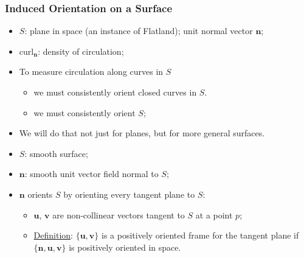 \begin{frame}
  \frametitle{Induced Orientation on a Surface}

  \begin{itemize}
    \item $S$: plane in space (an instance of Flatland); unit normal vector $\textbf{n}$;
    \item $\text{curl}_{\textbf{n}}$: density of circulation;
    \item \pause To measure circulation along curves in $S$
    \begin{itemize}
      \item we must consistently orient closed curves in $S$.
      \item we must consistently orient $S$;
    \end{itemize}
    \item \pause We will do that not just for planes, but for more general surfaces.
  \end{itemize}

  \begin{itemize}
    \item $S$: smooth surface;
    \item $\textbf{n}$: smooth unit vector field normal to $S$;
    \item $\textbf{n}$ orients $S$ by orienting every tangent plane to $S$:
    \begin{itemize}
      \item $\textbf{u}$, $\textbf{v}$ are non-collinear vectors tangent to $S$ at a point $p$;
      \item \underline{Definition}: $\{\textbf{u},\textbf{v}\}$ is a positively oriented frame for the tangent plane if $\{\textbf{n},\textbf{u},\textbf{v}\}$ is positively oriented in space.
    \end{itemize}
  \end{itemize}
\end{frame}

